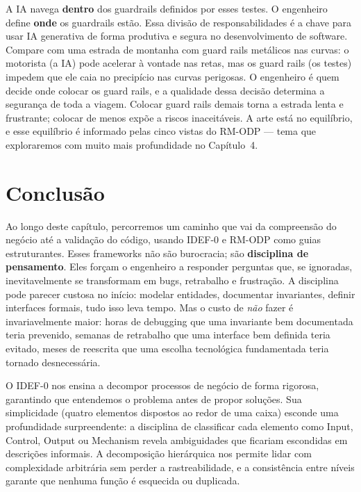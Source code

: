 A IA navega \textbf{dentro} dos guardrails definidos por esses testes.
O engenheiro define \textbf{onde} os guardrails estão. Essa divisão de
responsabilidades é a chave para usar IA generativa de forma produtiva
e segura no desenvolvimento de software. Compare com uma estrada de montanha com
guard rails metálicos nas curvas: o motorista (a IA) pode acelerar à vontade nas
retas, mas os guard rails (os testes) impedem que ele caia no precipício nas
curvas perigosas. O engenheiro é quem decide onde colocar os guard rails, e a
qualidade dessa decisão determina a segurança de toda a viagem. Colocar guard
rails demais torna a estrada lenta e frustrante; colocar de menos expõe a riscos
inaceitáveis. A arte está no equilíbrio, e esse equilíbrio é informado pelas
cinco vistas do RM-ODP --- tema que exploraremos com muito mais profundidade no
Capítulo~4.


\section{Conclusão}

Ao longo deste capítulo, percorremos um caminho que vai da compreensão do
negócio até a validação do código, usando IDEF-0 e RM-ODP como guias
estruturantes. Esses frameworks não são burocracia; são \textbf{disciplina
de pensamento}. Eles forçam o engenheiro a responder perguntas que, se
ignoradas, inevitavelmente se transformam em bugs, retrabalho e frustração.
A disciplina pode parecer custosa no início: modelar entidades, documentar
invariantes, definir interfaces formais, tudo isso leva tempo. Mas o custo
de \emph{não} fazer é invariavelmente maior: horas de debugging que uma
invariante bem documentada teria prevenido, semanas de retrabalho que uma
interface bem definida teria evitado, meses de reescrita que uma escolha
tecnológica fundamentada teria tornado desnecessária.

O IDEF-0 nos ensina a decompor processos de negócio de forma rigorosa,
garantindo que entendemos o problema antes de propor soluções. Sua simplicidade
(quatro elementos dispostos ao redor de uma caixa) esconde uma profundidade
surpreendente: a disciplina de classificar cada elemento como Input, Control,
Output ou Mechanism revela ambiguidades que ficariam escondidas em descrições
informais. A decomposição hierárquica nos permite lidar com complexidade arbitrária
sem perder a rastreabilidade, e a consistência entre níveis garante que nenhuma
função é esquecida ou duplicada.

